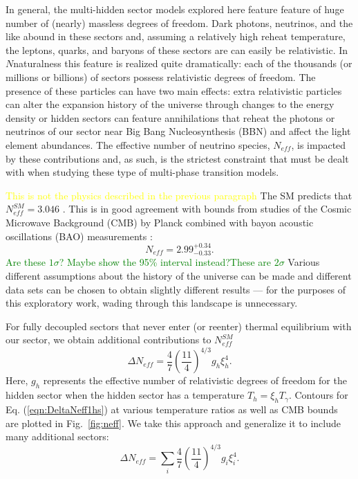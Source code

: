 \documentclass[nofootinbib,twocolumn,preprintnumbers]{revtex4-1}
\begin{document}
In general, the multi-hidden sector models explored here feature feature of huge number of (nearly) massless degrees of freedom. Dark photons, neutrinos, and the like abound in these sectors and, assuming a relatively high reheat temperature, the leptons, quarks, and baryons of these sectors are can easily be relativistic. In $N$naturalness this feature is realized quite dramatically: each of the thousands (or millions or billions) of sectors possess relativistic degrees of freedom. The presence of these particles can have two main effects: extra relativistic particles can alter the expansion history of the universe through changes to the energy density or hidden sectors can feature annihilations that reheat the photons or neutrinos of our sector near Big Bang Nucleosynthesis (BBN) and affect the light element abundances. The effective number of neutrino species, $N_{eff}$, is impacted by these contributions and, as such, is the strictest constraint that must be dealt with when studying these type of multi-phase transition models. 

\textcolor{yellow}{This is not the physics described in the previous paragraph} The SM predicts that $N^{SM}_{eff} = 3.046$ \cite{Mangano:2005cc}. This is in good agreement with bounds from studies of the Cosmic Microwave Background (CMB) by Planck combined with bayon acoustic oscillations (BAO) measurements \cite{Aghanim:2018eyx}:
\begin{equation}\label{eqn:NeffBounds}
N_{eff} = 2.99^{+0.34}_{-0.33}.
\end{equation}
\textcolor{green}{Are these $1\sigma$? Maybe show the 95\% interval instead?These are $2\sigma$}
Various different assumptions about the history of the universe can be made and different data sets can be chosen to obtain slightly different results \cite{Breitbach:2018ddu} --- for the purposes of this exploratory work, wading through this landscape is unnecessary.

For fully decoupled sectors that never enter (or reenter) thermal equilibrium with our sector, we obtain additional contributions to $N^{SM}_{eff}$ \cite{Breitbach:2018ddu}
\begin{equation}\label{eqn:DeltaNeff1hs}
\Delta N_{eff} = \frac{4}{7}\left(\frac{11}{4}\right)^{4/3}g_h \xi_h^4.
\end{equation} 
Here, $g_h$ represents the effective number of relativistic degrees of freedom for the hidden sector when the hidden sector has a temperature $T_h = \xi_h T_\gamma$. Contours for Eq. (\ref{eqn:DeltaNeff1hs}) at various temperature ratios as well as CMB bounds are plotted in Fig.~\ref{fig:neff}. We take this approach and generalize it to include many additional sectors:
\begin{equation}\label{eqn:DeltaNeff}
\Delta N_{eff} = \sum_i \frac{4}{7}\left(\frac{11}{4}\right)^{4/3}g_{i} \xi^4_{i}.
\end{equation} 
\end{document}
